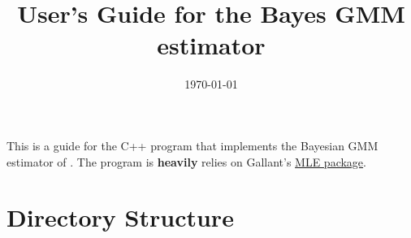 \documentclass[11pt, letterpaper, notitlepage]{article}
\title{User's Guide for the Bayes GMM estimator}
\author{}
\date{\today}
\begin{document}
\maketitle

\setlength{\parskip}{9pt}
\setlength{\parindent}{0pt}

This is a guide for the C++ program that implements the Bayesian GMM estimator of \cite{GGR_2017}. The program is \textbf{heavily} relies on Gallant's \href{https://www.aronaldg.org/webfiles/mle/}{MLE package}.   

\section*{Directory Structure}

\begin{description}


\end{description}
\end{document}
